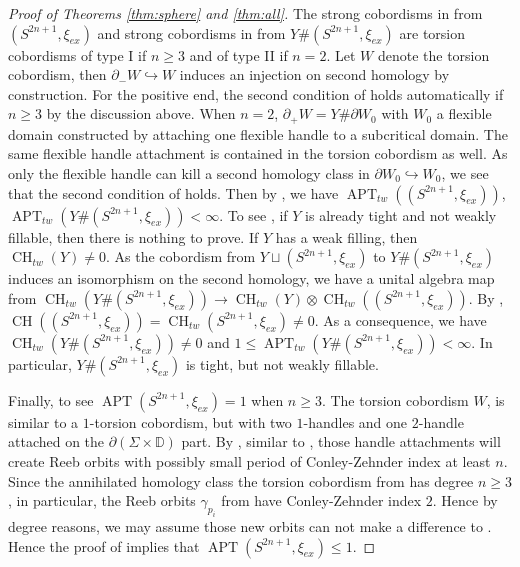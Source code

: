 \documentclass[11pt]{amsart}
\numberwithin{equation}{section}
\def\D{{\mathbb D}}
\DeclareMathOperator{\APT}{APT}
\DeclareMathOperator{\CH}{CH}
\begin{document}
\begin{proof}[Proof of Theorems \ref{thm:sphere} and \ref{thm:all}]
    The strong cobordisms in \cite[Theorem 5.1]{bowden2022tight} from $(S^{2n+1},\xi_{ex})$ and strong cobordisms in \cite[Theorem A]{bowden2022tight} from $Y\#(S^{2n+1},\xi_{ex})$ are torsion cobordisms of type I if $n\ge 3$ and of type II if $n=2$. Let $W$ denote the torsion cobordism, then $\partial_-W\hookrightarrow W$ induces an injection on second homology by construction. For the positive end, the second condition of  holds automatically if $n\ge 3$ by the discussion above. When $n=2$, $\partial_+W=Y\#\partial W_0$ with $W_0$ a flexible domain constructed by attaching one flexible handle to a subcritical domain. The same flexible handle attachment is contained in the torsion cobordism as well. As only the flexible handle can kill a second homology class in $\partial W_0\hookrightarrow W_0$, we see that the second condition of  holds. Then by , we have $\APT_{tw}((S^{2n+1},\xi_{ex}))$, $\APT_{tw}(Y\#(S^{2n+1},\xi_{ex}))<\infty$. To see , if $Y$ is already tight and not weakly fillable, then there is nothing to prove. If $Y$ has a weak filling, then $\CH_{tw}(Y)\ne 0$. As the cobordism from $Y\sqcup (S^{2n+1},\xi_{ex})$ to $Y\#(S^{2n+1},\xi_{ex})$ induces an isomorphism on the second homology, we have a unital algebra map from $\CH_{tw}(Y\#(S^{2n+1},\xi_{ex}))\to \CH_{tw}(Y)\otimes \CH_{tw}((S^{2n+1},\xi_{ex}))$. By \cite[Theorem 5.1]{bowden2022tight}, $\CH((S^{2n+1},\xi_{ex}))=\CH_{tw}(S^{2n+1},\xi_{ex})\ne 0$. As a consequence, we have $\CH_{tw}(Y\#(S^{2n+1},\xi_{ex}))\ne 0$ and $1\le \APT_{tw}(Y\#(S^{2n+1},\xi_{ex}))<\infty$. In particular, $Y\#(S^{2n+1},\xi_{ex})$ is tight, but not weakly fillable. 

    Finally, to see $\APT(S^{2n+1},\xi_{ex})=1$ when $n\ge 3$. The torsion cobordism $W$, is similar to a $1$-torsion cobordism, but with two $1$-handles and one $2$-handle attached on the $\partial(\Sigma \times \D)$ part. By \cite[\S 4]{Yau}, similar to , those handle attachments will create Reeb orbits with possibly small period of Conley-Zehnder index at least $n$. Since the annihilated homology class the torsion cobordism from \cite{bowden2022tight} has degree $n\ge 3$, in particular, the Reeb orbits $\gamma_{p_i}$ from  have Conley-Zehnder index $2$. Hence by degree reasons, we may assume those new orbits can not make a difference to . Hence the proof of  implies that $\APT(S^{2n+1},\xi_{ex})\le 1$.
\end{proof}
\end{document}
